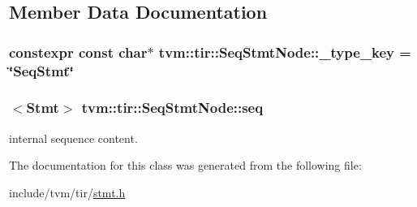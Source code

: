 \subsection{Member Data Documentation}
\subsubsection[{\texorpdfstring{\+\_\+type\+\_\+key}{_type_key}}]{\setlength{\rightskip}{0pt plus 5cm}constexpr const char$\ast$ tvm\+::tir\+::\+Seq\+Stmt\+Node\+::\+\_\+type\+\_\+key = \char`\"{}Seq\+Stmt\char`\"{}\hspace{0.3cm}{\ttfamily [static]}}\hypertarget{classtvm_1_1tir_1_1SeqStmtNode_a2601516ce9c3e5baa913340130f27a93}{}\label{classtvm_1_1tir_1_1SeqStmtNode_a2601516ce9c3e5baa913340130f27a93}
\subsubsection[{\texorpdfstring{seq}{seq}}]{$<${\bf Stmt}$>$ tvm\+::tir\+::\+Seq\+Stmt\+Node\+::seq}\hypertarget{classtvm_1_1tir_1_1SeqStmtNode_a0e548955529d35c56e646fcaac38f865}{}\label{classtvm_1_1tir_1_1SeqStmtNode_a0e548955529d35c56e646fcaac38f865}


internal sequence content. 



The documentation for this class was generated from the following file\+:\begin{DoxyCompactItemize}
\item 
include/tvm/tir/\hyperlink{stmt_8h}{stmt.\+h}\end{DoxyCompactItemize}
